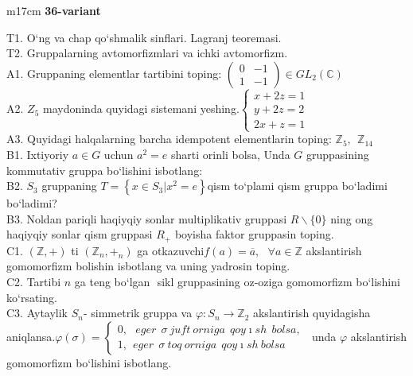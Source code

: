 \documentclass{article}
\begin{document}
\begin{tabular}{m{17cm}}
\textbf{36-variant}
\newline

T1. O`ng va chap qo`shmalik sinflari. Lagranj teoremasi. \\
T2. Gruppalarning avtomorfizmlari va ichki avtomorfizm. \\
A1. Gruppaning elementlar tartibini toping: \(\begin{pmatrix}
0 & - 1 \\
1 & - 1
\end{pmatrix} \in GL_{2}(\mathbb{C})\) \\
A2. \(Z_{5}\) maydoninda quyidagi sistemani yeshing.\(\left\{ \begin{matrix}
x + 2z = 1 \\
y + 2z = 2 \\
2x + z = 1
\end{matrix} \right.\ \) \\
A3. Quyidagi halqalarning barcha idempotent elementlarin toping: \(\mathbb{Z}_{5},\ \ \mathbb{Z}_{14}\) \\
B1. Ixtiyoriy \(a \in G\) uchun \(a^{2} = e\) sharti orinli bolsa, Unda \(G\) gruppasining kommutativ gruppa bo`lishini isbotlang: \\
B2. \(S_{3}\) gruppaning \(T = \left\{ x \in S_{3}|x^{2} = e \right\}\)qism to`plami qism gruppa bo`ladimi bo`ladimi? \\
B3. Noldan pariqli haqiyqiy sonlar multiplikativ gruppasi \(R\backslash\{ 0\}\) ning o\textquotesingle ng haqiyqiy sonlar qism gruppasi \(R_{+}\) boyisha faktor gruppasin toping. \\
C1. \(\left( \mathbb{Z}, + \right)\) ti \(\left( \mathbb{Z}_{n}, +_{n} \right)\) ga o\textquotesingle tkazuvchi\(f(a) = \overline{a},\ \ \ \forall a\mathbb{\in Z}\) akslantirish gomomorfizm bolishin isbotlang va uning yadrosin toping. \\
C2. Tartibi \(n\) ga teng bo`lgan \(< a >\) sikl gruppasining o\textquotesingle z-o\textquotesingle ziga gomomorfizm bo`lishini ko`rsating. \\
C3. Aytaylik \(S_{n}\)- simmetrik gruppa va \(\varphi:S_{n} \rightarrow \mathbb{Z}_{2}\) akslantirish quyidagisha aniqlansa.\(\varphi(\sigma) = \left\{ \begin{matrix}
0,\ \ \ eger\ \ \sigma\ juft\ orniga\ \ qoy\imath sh\ \ bolsa, \\
1,\ \ eger\ \ \sigma\ toq\ orniga\ \ qoy\imath sh\ bolsa
\end{matrix} \right.\ \) unda \(\varphi\) akslantirish gomomorfizm bo`lishini isbotlang. \\

\end{tabular}
\vspace{1cm}
\end{document}

